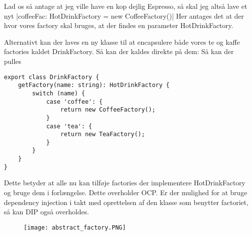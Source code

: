 \documentclass[../SWD_disp.tex]{subfiles}
\begin{document}
Lad os så antage at jeg ville have en kop dejlig Espresso, så skal jeg altså lave et nyt 
|coffeeFac: HotDrinkFactory = new CoffeeFactory()|
Her antages det at der hvor vores factory skal bruges, at der findes en parameter HotDrinkFactory. 

Alternativt kan der laves en ny klasse til at encapsulere både vores te og kaffe factories kaldet DrinkFactory. Så kan der kaldes direkte på dem: 
Så kan der pulles

\begin{verbatim}
export class DrinkFactory {
    getFactory(name: string): HotDrinkFactory {
        switch (name) {
            case 'coffee': {
                return new CoffeeFactory();
            }
            case 'tea': {
                return new TeaFactory();
            }
        }
    }
}
\end{verbatim}

Dette betyder at alle nu kan tilføje factories der implementere HotDrinkFactory og bruge dem i forlængelse. Dette overholder OCP. Er der mulighed for at bruge dependency injection i takt med oprettelsen af den klasse som benytter factoriet, så kan DIP også overholdes.

\begin{figure}[H]
    \centering
    \texttt{[image: abstract\_factory.PNG]}
\end{figure}
\end{document}
